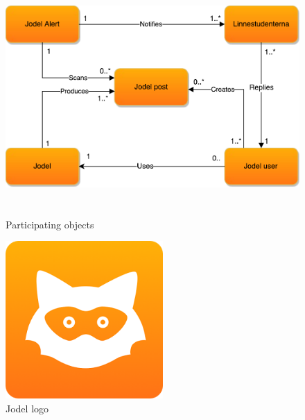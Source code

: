 \documentclass[a4paper,12pt]{article}
\begin{document}
\begin{figure}[!h]
	\centering
	\includegraphics[height=9cm]{img/ParticipatingObjects.pdf}
	\caption{Participating objects}
	\label{Participating objects}
\end{figure}
\begin{figure}[!h]
	\centering
	\includegraphics[height=6cm]{img/jodel.png}
	\caption{Jodel logo}
	\label{Jodel}
\end{figure}
\end{document}
